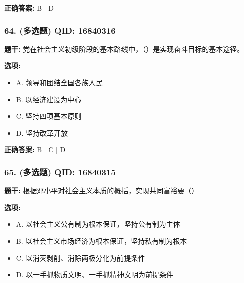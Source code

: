 \documentclass[12pt,UTF8]{ctexart}
\begin{document}
\textbf{正确答案:}
B | D

\vspace{0.3em}\hrulefill\vspace{0.7em}

\subsubsection*{64. (多选题) \small QID: 16840316}

\textbf{题干:}
党在社会主义初级阶段的基本路线中，（）是实现奋斗目标的基本途径。

\textbf{选项:}
\begin{itemize}[leftmargin=*]

  \item A. 领导和团结全国各族人民

  \item B. 以经济建设为中心

  \item C. 坚持四项基本原则

  \item D. 坚持改革开放

\end{itemize}

\textbf{正确答案:}
B | C | D

\vspace{0.3em}\hrulefill\vspace{0.7em}

\subsubsection*{65. (多选题) \small QID: 16840315}

\textbf{题干:}
根据邓小平对社会主义本质的概括，实现共同富裕要（）

\textbf{选项:}
\begin{itemize}[leftmargin=*]

  \item A. 以社会主义公有制为根本保证，坚持公有制为主体

  \item B. 以社会主义市场经济为根本保证，坚持私有制为根本

  \item C. 以消灭剥削、消除两极分化为前提条件

  \item D. 以一手抓物质文明、一手抓精神文明为前提条件

\end{itemize}
\end{document}
